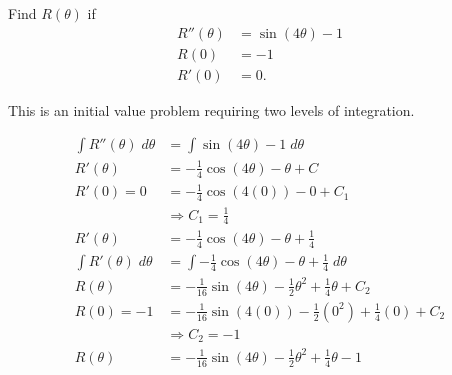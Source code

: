 \documentclass{ximera}
\author{Emma Smith Zbarsky}
\begin{document}
\begin{exercise}

Find $R(\theta)$ if \begin{align*}
R''(\theta) &= \sin(4\theta)-1 \\
R(0)&=-1 \\ R'(0)&=0. \end{align*}


\begin{hint}
This is an initial value problem requiring two levels of integration.
\end{hint}


\begin{hint}
\begin{align*}
\int R''(\theta) \; d\theta &= \int \sin(4\theta)-1\; d\theta \\
R'(\theta) &= -\frac{1}{4}\cos(4\theta)-\theta+C \\
R'(0)=0 &= -\frac{1}{4}\cos(4(0))-0+C_1 \\
& \Rightarrow C_1=\frac{1}{4} \\
R'(\theta) &= -\frac{1}{4}\cos(4\theta)-\theta+\frac{1}{4} \\
\int R'(\theta)\; d\theta &= \int  -\frac{1}{4}\cos(4\theta)-\theta+\frac{1}{4}\; d\theta \\ 
R(\theta) &= -\frac{1}{16}\sin(4\theta)-\frac{1}{2}\theta^2+\frac{1}{4}\theta+C_2 \\
R(0) = -1 &= -\frac{1}{16}\sin(4(0))-\frac{1}{2}(0^2)+\frac{1}{4}(0)+C_2 \\
&\Rightarrow C_2=-1 \\
R(\theta) &= -\frac{1}{16}\sin(4\theta)-\frac{1}{2}\theta^2+\frac{1}{4}\theta-1
\end{align*}
\end{hint}


\begin{multipleChoice}
\end{multipleChoice}

\end{exercise}
\end{document}

